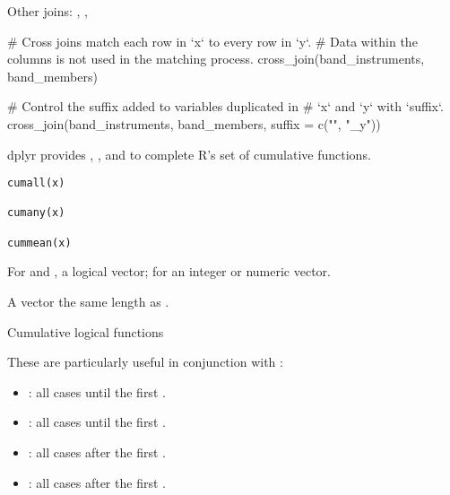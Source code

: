 \documentclass[a4paper]{book}
\begin{document}
%
\begin{SeeAlso}
Other joins: 
,
,
\end{SeeAlso}
%
\begin{Examples}
\begin{ExampleCode}
# Cross joins match each row in `x` to every row in `y`.
# Data within the columns is not used in the matching process.
cross_join(band_instruments, band_members)

# Control the suffix added to variables duplicated in
# `x` and `y` with `suffix`.
cross_join(band_instruments, band_members, suffix = c("", "_y"))
\end{ExampleCode}
\end{Examples}
%
\begin{Description}
dplyr provides , , and  to complete R's set
of cumulative functions.
\end{Description}
%
\begin{Usage}
\begin{verbatim}
cumall(x)

cumany(x)

cummean(x)
\end{verbatim}
\end{Usage}
%
\begin{Arguments}
\begin{ldescription}
\item[\code{x}] For  and , a logical vector; for
 an integer or numeric vector.
\end{ldescription}
\end{Arguments}
%
\begin{Value}
A vector the same length as .
\end{Value}
%
\begin{Section}{Cumulative logical functions}


These are particularly useful in conjunction with :
\begin{itemize}

\item{} : all cases until the first .
\item{} : all cases until the first .
\item{} : all cases after the first .
\item{} : all cases after the first .

\end{itemize}

\end{Section}
\end{document}
